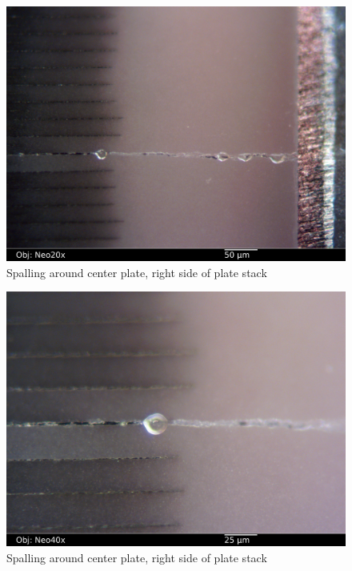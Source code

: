 \documentclass{article}
\begin{document}
\begin{figure}[h]
\includegraphics[width=12cm,keepaspectratio]{section2_07_df_neo20x_annotated.jpg}
\caption{Spalling around center plate, right side of plate stack}
\label{spalling}
\end{figure}

\begin{figure}[h]
\includegraphics[width=12cm,keepaspectratio]{section2_09_bf_neo40x_annotated.jpg}
\caption{Spalling around center plate, right side of plate stack}
\label{spalling2}
\end{figure}
\end{document}
